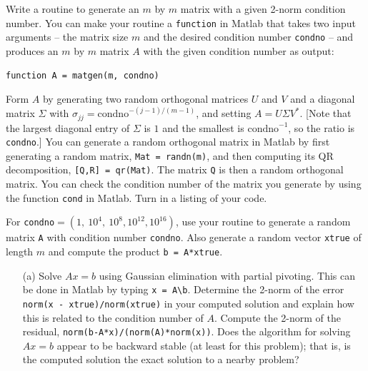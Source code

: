 \documentclass[10pt]{article}
\begin{document}
\maketitle

\begin{problem}[Exercise 1]

Write a routine to generate an \(m\) by \(m\) matrix with a given 2-norm condition
number.  You can make your routine a \verb+function+ in Matlab that takes
two input arguments -- the matrix size \(m\) and the desired condition number
\verb+condno+ -- and produces an \(m\) by \(m\) matrix \(A\) with the given condition
number as output:

\begin{verbatim}
function A = matgen(m, condno)
\end{verbatim}

Form \(A\) by generating two random orthogonal matrices \(U\) and \(V\) and a 
diagonal matrix \(\Sigma\) with \(\sigma_{jj} = \mbox{condno}^{-(j-1)/(m-1)}\),
and setting \(A = U \Sigma V^{*}\).  [Note that the largest diagonal entry
of \(\Sigma\) is \(1\) and the smallest is \(\mbox{condno}^{-1}\), so the ratio is
\verb+condno+.]  You can generate a random orthogonal matrix in Matlab by
first generating a random matrix, \verb+Mat = randn(m)+, and then computing
its QR decomposition, \verb+[Q,R] = qr(Mat)+.  The matrix \verb+Q+ is then
a random orthogonal matrix.  You can check the condition number of the
matrix you generate by using the function \verb+cond+ in Matlab.  Turn in
a listing of your code.

For \verb+condno+$= (1,~10^4 ,~10^8 , 10^{12} , 10^{16})$, use your routine
to generate a random matrix \verb+A+ with condition number \verb+condno+.
Also generate a random vector \verb+xtrue+ of length \(m\) and compute
the product \verb+b = A*xtrue+.

\begin{enumerate}
    \item[(a)]
Solve \(Ax=b\) using Gaussian elimination with partial pivoting.  This
can be done in Matlab by typing \verb+x = A\b+.  Determine the 2-norm
of the error {\tt norm(x - xtrue)/norm(xtrue)} in your computed solution and explain how this is related to the condition number of \(A\).  Compute the 2-norm of the residual, \verb+norm(b-A*x)/(norm(A)*norm(x))+.  Does the algorithm for solving \(Ax=b\) appear to be backward stable (at least for this problem); that is, is the computed solution the exact solution to a nearby problem?


\end{enumerate}
\end{problem}
\end{document}

